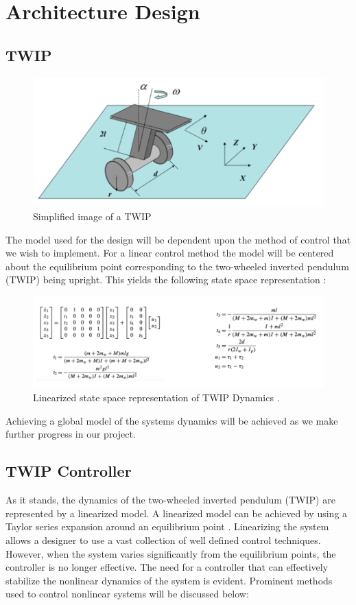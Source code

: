 \documentclass[a4paper,12pt]{article}
\begin{document}
\section{Architecture Design}
\subsection{TWIP}
	\begin{figure}[H]
\includegraphics[width = \textwidth]{images/PDS_TWIP.png}
\caption{Simplified image of a TWIP\cite{yang}}
	\end{figure}
The model used for the design will be dependent upon the method of control that we wish to implement. For a linear control method the model will be centered about the equilibrium point corresponding to the two-wheeled inverted pendulum (TWIP) being upright. This yields the following state space representation \cite{yang} :
	\begin{figure}[H]
\includegraphics[width = \textwidth]{images/PDS_StateSpace.png}
\caption{Linearized state space representation of TWIP Dynamics \cite{yang}.}
	\end{figure}
Achieving a global model of the systems dynamics will be achieved as we make further progress in our project. 
\subsection{TWIP Controller}
As it stands, the dynamics of the two-wheeled inverted pendulum (TWIP) are represented by a linearized model. A linearized model can be achieved by using a Taylor series expansion around an equilibrium point \cite{yang}. Linearizing the system allows a designer to use a vast collection of well defined control techniques. However, when the system varies significantly from the equilibrium points, the controller is no longer effective. The need for a controller that can effectively stabilize the nonlinear dynamics of the system is evident. Prominent methods used to control nonlinear systems will be discussed below:
\end{document}
